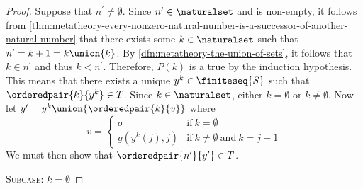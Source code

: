 \begin{proof}
    \vspace{0.3cm}
    \noindent
    Suppose that \( n^{\prime} \neq \emptyset \).
    Since \( n^{\prime} \in \naturalset \) and is non-empty, it follows from \cref{thm:metatheory-every-nonzero-natural-number-is-a-successor-of-another-natural-number}
    that there exists some \( k \in \naturalset \) such that \( n^{\prime} = k + 1 = k \union \mleft\{ k \mright\} \).
    By \cref{dfn:metatheory-the-union-of-sets}, it follows that \( k \in n^{\prime} \) and thus \( k < n^{\prime} \).
    Therefore, \( P(k) \) is a true by the induction hypothesis.
    This means that there exists a unique \( y^{k} \in \finiteseq{S} \) such that \( \orderedpair{k}{y^{k}} \in T \).
    Since \( k \in \naturalset \), either \( k = \emptyset \) or \( k \neq \emptyset \).
    Now let \( y^{\prime} = y^{k} \union \mleft\{ \orderedpair{k}{v} \mright\} \) where
    \begin{equation}
        \label{eq:possible-options-for-v}
        v =
        \begin{cases}
            \sigma &\text{if} \ k = \emptyset\\
            g(y^{k}(j), j) &\text{if} \ k \neq \emptyset \ \text{and} \ k = j + 1
        \end{cases}
    \end{equation}
    We must then show that \( \orderedpair{n^{\prime}}{y^{\prime}} \in T \).

    \vspace{0.3cm}
    \noindent
    {\scshape Subcase:} \( k = \emptyset \)


\end{proof}
